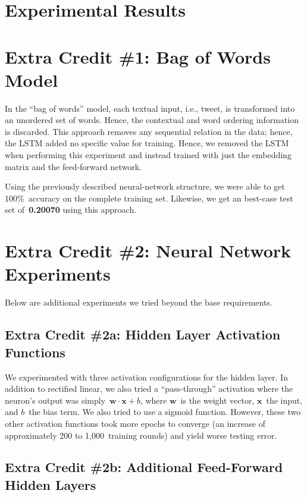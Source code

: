 \documentclass{report}
\begin{document}
  \section{Experimental Results} \label{sec:experimentalResults}
  
  \section{Extra Credit \#1: Bag of Words Model}
  
  In the ``bag of words'' model, each textual input, i.e., tweet, is transformed into an unordered set of words.  Hence, the contextual and word ordering information is discarded.  This approach removes any sequential relation in the data; hence, the LSTM added no specific value for training.  Hence, we removed the LSTM when performing this experiment and instead trained with just the embedding matrix and the feed-forward network. 
  
  Using the previously described neural-network structure, we were able to get 100\%~accuracy on the complete training set.  Likewise, we get an best-case test set of~\textbf{0.20070} using this approach.
  
  \section{Extra Credit \#2: Neural Network Experiments}
  
  Below are additional experiments we tried beyond the base requirements.  
  
  \subsection{Extra Credit \#2a: Hidden Layer Activation Functions}
  
  We experimented with three activation configurations for the hidden layer.  In addition to rectified linear, we also tried a ``pass-through'' activation where the neuron's output was simply~$\textbf{w}\cdot\textbf{x} + b$, where $\textbf{w}$~is the weight vector, $\textbf{x}$~the input, and $b$~the bias term.  We also tried to use a sigmoid function.  However, these two other activation functions took more epochs to converge (an increase of approximately 200 to 1,000~training rounds) and yield worse testing error.
  
  \subsection{Extra Credit \#2b: Additional Feed-Forward Hidden Layers}
  
\end{document}
